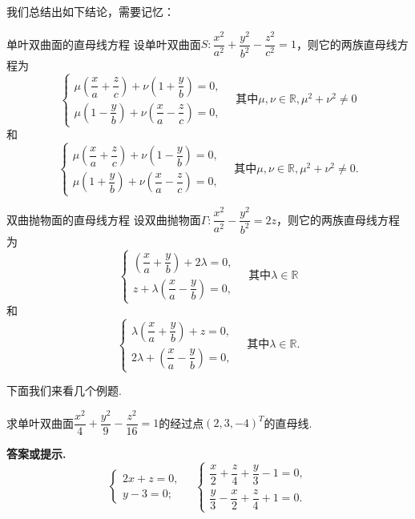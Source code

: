\documentclass[12pt, a4paper,newtx]{ctexart}
\newenvironment{hint}{\textbf{答案或提示. }}{}{}
\begin{document}
我们总结出如下结论，需要记忆：\begin{conclusion}{单叶双曲面的直母线方程}{}
	设单叶双曲面$S:\dfrac{x^2}{a^2}+\dfrac{y^2}{b^2}-\dfrac{z^2}{c^2}=1$，则它的两族直母线方程为
	\begin{equation}\label{1.1.1}
		\begin{cases}
			\mu\left(\dfrac{x}a+\dfrac{z}{c}\right)+\nu\left(1+\dfrac{y}{b}\right)=0,\\\mu\left(1-\dfrac{y}{b}\right)+\nu\left(\dfrac{x}a-\dfrac{z}{c}\right)=0,
		\end{cases}\quad\text{其中}\mu,\nu\in\mathbb R,\mu^2+\nu^2\ne0\tag{$\spadesuit$}
	\end{equation}
	和\begin{equation}\label{1.1.2}
		\begin{cases}
			\mu\left(\dfrac{x}a+\dfrac{z}{c}\right)+\nu\left(1-\dfrac{y}{b}\right)=0,\\\mu\left(1+\dfrac{y}{b}\right)+\nu\left(\dfrac{x}a-\dfrac{z}{c}\right)=0,
		\end{cases}\quad\text{其中}\mu,\nu\in\mathbb R,\mu^2+\nu^2\ne0.\tag{$\heartsuit$}
	\end{equation}
\end{conclusion}
\begin{conclusion}
	{双曲抛物面的直母线方程}{}
	设双曲抛物面$\Gamma:\dfrac{x^2}{a^2}-\dfrac{y^2}{b^2}=2z$，则它的两族直母线方程为
	\begin{equation}\label{1.2.1}
		\begin{cases}
			\left(\dfrac{x}a+\dfrac{y}{b}\right)+2\lambda=0,\\
			z+\lambda\left(\dfrac{x}a-\dfrac{y}{b}\right)=0,
		\end{cases}\quad\text{其中}\lambda\in\mathbb{R}\tag{$\clubsuit$}
	\end{equation}
	和\begin{equation}\label{1.2.2}
		\begin{cases}
			\lambda\left(\dfrac{x}a+\dfrac{y}{b}\right)+z=0,\\
			2\lambda+\left(\dfrac{x}a-\dfrac{y}{b}\right)=0,
		\end{cases}\quad\text{其中}\lambda\in\mathbb{R}.\tag{$\diamondsuit$}
	\end{equation}
\end{conclusion}
下面我们来看几个例题.
\begin{example}{}{}
	求单叶双曲面$\dfrac{x^2}{4}+\dfrac{y^2}{9}-\dfrac{z^2}{16}=1$的经过点$(2,3,-4)^T$的直母线. 
\end{example}
\begin{hint}
	\[\begin{cases}
		2x+z=0,\\y-3=0;
	\end{cases}\quad\begin{cases}\dfrac{x}{2}+\dfrac{z}{4}+\dfrac{y}{3}-1=0,\\\dfrac{y}{3}-\dfrac{x}{2}+\dfrac{z}{4}+1=0.
	\end{cases}\]
\end{hint}
\end{document}
